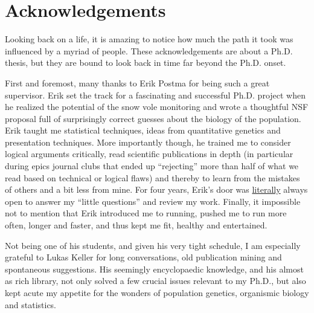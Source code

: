 
\chapter{Acknowledgements}

Looking back on a life, it is amazing to notice how much the path it took was influenced by a myriad of people. These acknowledgements are about a Ph.D. thesis, but they are bound to look back in time far beyond the Ph.D. onset.

First and foremost, many thanks to Erik Postma for being such a great supervisor. Erik set the track for a fascinating and successful Ph.D. project when he realized the potential of the snow vole monitoring and wrote a thoughtful NSF proposal full of surprisingly correct guesses about the biology of the population. Erik taught me statistical techniques, ideas from quantitative genetics and presentation techniques. More importantly though, he trained me to consider logical arguments critically, read scientific publications in depth (in particular during epics journal clubs that ended up ``rejecting'' more than half of what we read based on technical or logical flaws) and thereby to learn from the mistakes of others and a bit less from mine. For four years, Erik's door was \href{https://xkcd.com/725/}{literally} always open to answer my ``little questions'' and review my work. Finally, it impossible not to mention that Erik introduced me to running, pushed me to run more often, longer and faster, and thus kept me fit, healthy and entertained.

Not being one of his students, and given his very tight schedule, I am especially grateful to Lukas Keller for long conversations, old publication mining and spontaneous suggestions. His seemingly encyclopaedic knowledge, and his almost as rich library, not only solved a few crucial issues relevant to my Ph.D., but also kept acute my appetite for the wonders of population genetics, organismic biology and statistics. 

